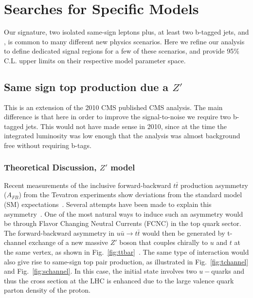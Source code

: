 \section{Searches for Specific Models}
\label{sec:stampCollecting}

Our signature, two isolated same-sign leptons plus, at least two b-tagged jets, and \met, 
is common to many different new physics scenarios.
Here we refine our analysis to define dedicated signal regions for a few of these scenarios,
and provide 95\% C.L. upper limits on their respective model parameter space.


\subsection{Same sign top production due a $Z'$}
\label{sec:sstops}

This is an extension of the 2010 CMS published CMS analysis\cite{sstop}.
The main difference is that here in order to improve the signal-to-noise
we require two b-tagged jets.  This would not have made sense in 2010, since 
at the time the integrated luminosity was low enough that the analysis was almost
background free without requiring b-tags.

\subsubsection{Theoretical Discussion, $Z'$ model}

Recent measurements of the inclusive forward-backward $t\bar{t}$ production 
asymmetry ($A_{FB}$) from the 
Tevatron experiments show deviations from the standard model 
(SM) expectations~\cite{d0:fwtop, cdf:fwtop1, cdf:fwtop2}.
Several attempts have been made to explain this asymmetry~\cite{berger, Buckley, Gresham, zoltan}. 
One of the most natural ways to induce such an asymmetry would be through
Flavor Changing Neutral Currents (FCNC) in the top quark sector. 
The forward-backward asymmetry in $u\bar{u} \to t\bar{t}$ would then be generated
by t-channel exchange of a new massive $Z'$ boson that couples chirally to
$u$ and $t$ at the same vertex, as shown in Fig.~\ref{fig:ttbar}~\cite{berger}.
The same type of interaction would also give rise to same-sign top pair production, 
as illustrated in Fig.~\ref{fig:tchannel} and Fig.~\ref{fig:schannel}. 
In this case, the initial state involves two $u-$quarks and 
thus the cross section at the LHC is enhanced due 
to the large valence quark parton density of the proton. 

